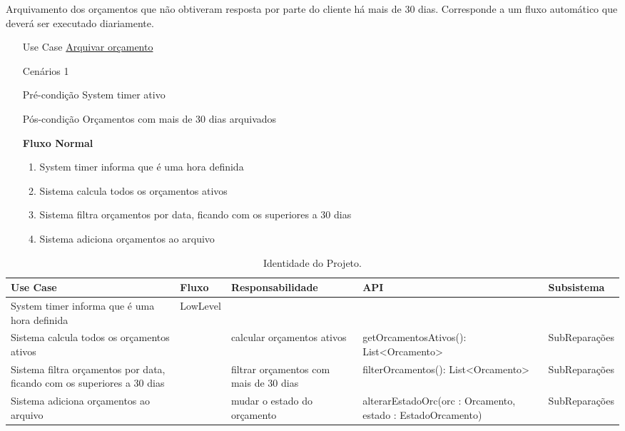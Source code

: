 \documentclass[../relatorio.tex]{subfiles}
\begin{document}
Arquivamento dos orçamentos que não obtiveram resposta por parte do cliente há mais de 30 dias.
Corresponde a um fluxo automático que deverá ser executado diariamente.
\begin{itemize}
    \item[Use Case] {\underline{Arquivar orçamento}}
    \item[Cenários] {1}
    \item[Pré-condição] {System timer ativo}
    \item[Pós-condição] {Orçamentos com mais de 30 dias arquivados}
          \begin{flushleft}
              \textbf{Fluxo Normal}
          \end{flushleft}
          \begin{enumerate}
              \item System timer informa que é uma hora definida
              \item Sistema calcula todos os orçamentos ativos
              \item Sistema filtra orçamentos por data, ficando com os superiores a 30 dias
              \item Sistema adiciona orçamentos ao arquivo
          \end{enumerate}
\end{itemize}
\begin{landscape}
    \begin{table}[!h]
        \centering
        \begin{tabular}{|p{5cm}|p{1cm}|p{4cm}|p{6cm}|p{3cm}|}
            \hline
            \rowcolor{gray!20!white}
            Use Case                                                                & Fluxo    & Responsabilidade                       & API                                                      & Subsistema    \\
            \hline
            \rowcolor{red}
            System timer informa que é uma hora definida                            & LowLevel &                                        &                                                          &               \\
            \hline
            Sistema calcula todos os orçamentos ativos                              &          & calcular orçamentos ativos             & getOrcamentosAtivos(): List<Orcamento>                   & SubReparações \\
            \hline
            Sistema filtra orçamentos por data, ficando com os superiores a 30 dias &          & filtrar orçamentos com mais de 30 dias & filterOrcamentos(): List<Orcamento> & SubReparações \\
            \hline
            Sistema adiciona orçamentos ao arquivo                                  &          & mudar o estado do orçamento    & alterarEstadoOrc(orc : Orcamento, estado : EstadoOrcamento)                        & SubReparações \\
            \hline
        \end{tabular}
        \caption{Identidade do Projeto.}
    \end{table}
\end{landscape}
\end{document}
